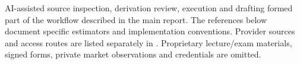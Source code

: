 \documentclass[11pt,a4paper]{article}
\begin{document}
AI-assisted source inspection, derivation review, execution and drafting formed part of the workflow described in the main report. The references below document specific estimators and implementation conventions. Provider sources and access routes are listed separately in . Proprietary lecture/exam materials, signed forms, private market observations and credentials are omitted.
\begingroup\small


\endgroup
\end{document}
